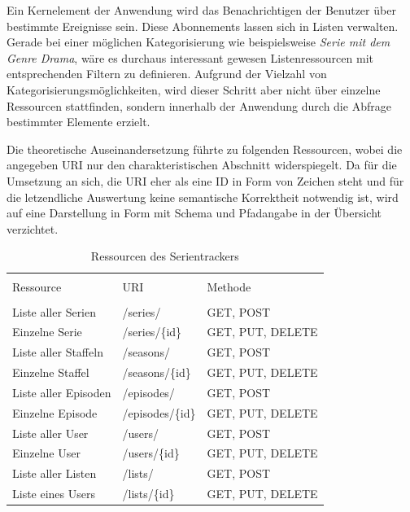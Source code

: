 Ein Kernelement der Anwendung wird das Benachrichtigen der Benutzer über bestimmte Ereignisse sein. Diese Abonnements lassen sich in Listen verwalten. Gerade bei einer möglichen Kategorisierung wie beispielsweise \textit{Serie mit dem Genre Drama}, wäre es durchaus interessant gewesen Listenressourcen mit entsprechenden Filtern zu definieren. Aufgrund der Vielzahl von Kategorisierungsmöglichkeiten, wird dieser Schritt aber nicht über einzelne Ressourcen stattfinden, sondern innerhalb der Anwendung durch die Abfrage bestimmter Elemente erzielt.\\

\vspace{0.2cm}

Die theoretische Auseinandersetzung führte zu folgenden Ressourcen, wobei die angegeben URI nur den charakteristischen Abschnitt widerspiegelt.
Da für die Umsetzung an sich, die URI eher als eine ID in Form von Zeichen steht und für die letzendliche Auswertung keine semantische Korrektheit notwendig ist, wird auf eine Darstellung in Form mit Schema und Pfadangabe in der Übersicht verzichtet.

\begin{table}[H]
\caption{Ressourcen des Serientrackers}

\centering
\begin{tabular}{l l l}
\\ [-0.5ex]

\hline\hline
\\ [-0.5ex]
Ressource & URI & Methode
\\ [1.5ex]
\hline
\\ [-0.5ex]
Liste aller Serien & /series/ & GET, POST \\[1ex]
Einzelne Serie & /series/\{id\} & GET, PUT, DELETE\\[1ex]
Liste aller Staffeln & /seasons/ & GET, POST \\[1ex]
Einzelne Staffel & /seasons/\{id\} & GET, PUT, DELETE\\[1ex]
Liste aller Episoden & /episodes/ & GET, POST \\[1ex]
Einzelne Episode & /episodes/\{id\} & GET, PUT, DELETE\\[1ex]
Liste aller User & /users/ & GET, POST \\[1ex]
Einzelne User & /users/\{id\} & GET, PUT, DELETE\\[1ex]
Liste aller Listen & /lists/ & GET, POST\\[1ex]
Liste eines Users & /lists/\{id\} & GET, PUT, DELETE\\[1ex]
\hline
\end{tabular}
\label{tab:ressourcendesserientrackers}
\end{table}

